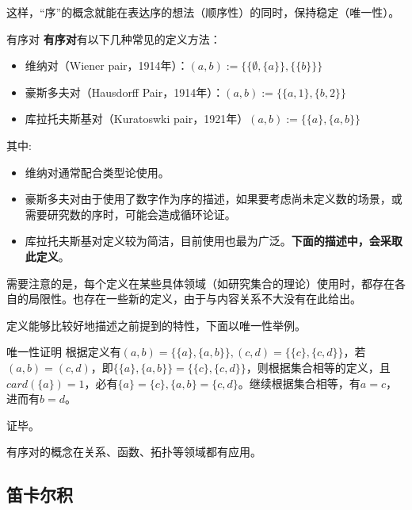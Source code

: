 这样，“序”的概念就能在表达序的想法（顺序性）的同时，保持稳定（唯一性）。

\begin{definition}{有序对}
\textbf{有序对}有以下几种常见的定义方法：
\begin{itemize}
\item 维纳对（Wiener pair，1914年）：$(a, b):= \{\{\emptyset,\{ a\}\}, \{\{b\}\}\} $
\item 豪斯多夫对（Hausdorff Pair，1914年）：$ (a, b):= \{\{a, 1\}, \{b, 2\}\} $
\item 库拉托夫斯基对（Kuratoswki pair，1921年）$(a, b) := \{\{a\}, \{a, b\}\}$
\end{itemize}
\end{definition}
其中:
\begin{itemize}
\item 维纳对通常配合类型论使用。
\item 豪斯多夫对由于使用了数字作为序的描述，如果要考虑尚未定义数的场景，或需要研究数的序时，可能会造成循环论证。
\item 库拉托夫斯基对定义较为简洁，目前使用也最为广泛。\textbf{下面的描述中，会采取此定义}。
\end{itemize}

需要注意的是，每个定义在某些具体领域（如研究集合的理论）使用时，都存在各自的局限性。也存在一些新的定义，由于与内容关系不大没有在此给出。

定义能够比较好地描述之前提到的特性，下面以唯一性举例。
\begin{example}{唯一性证明}
根据定义有$(a, b) = \{\{a\}, \{a, b\}\} , (c, d) = \{\{c\}, \{c, d\}\} $，若$(a, b)=(c,d)$，即$\{\{a\}, \{a, b\}\}=\{\{c\}, \{c, d\}\}$，则根据集合相等的定义，且$card(\{a\})=1$，必有$\{a\}=\{c\},\{a, b\}=\{c, d\}$。继续根据集合相等，有$a=c$，进而有$b=d$。

证毕。
\end{example}

有序对的概念在关系、函数、拓扑等领域都有应用。

\subsection{笛卡尔积}

